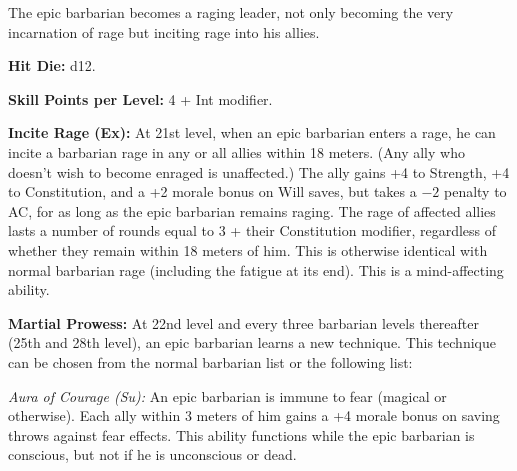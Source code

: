 
The epic barbarian becomes a raging leader, not only becoming the very incarnation of rage but inciting rage into his allies.

\textbf{Hit Die:} d12.

\textbf{Skill Points per Level:} 4 + Int modifier.

\textbf{Incite Rage (Ex):} At 21st level, when an epic barbarian enters a rage, he can incite a barbarian rage in any or all allies within 18 meters. (Any ally who doesn't wish to become enraged is unaffected.) The ally gains +4 to Strength, +4 to Constitution, and a +2 morale bonus on Will saves, but takes a $-2$ penalty to AC, for as long as the epic barbarian remains raging. The rage of affected allies lasts a number of rounds equal to 3 + their Constitution modifier, regardless of whether they remain within 18 meters of him. This is otherwise identical with normal barbarian rage (including the fatigue at its end). This is a mind-affecting ability.

\textbf{Martial Prowess:} At 22nd level and every three barbarian levels thereafter (25th and 28th level), an epic barbarian learns a new technique. This technique can be chosen from the normal barbarian list or the following list:

\textit{Aura of Courage (Su):} An epic barbarian is immune to fear (magical or otherwise). Each ally within 3 meters of him gains a +4 morale bonus on saving throws against fear effects. This ability functions while the epic barbarian is conscious, but not if he is unconscious or dead.

